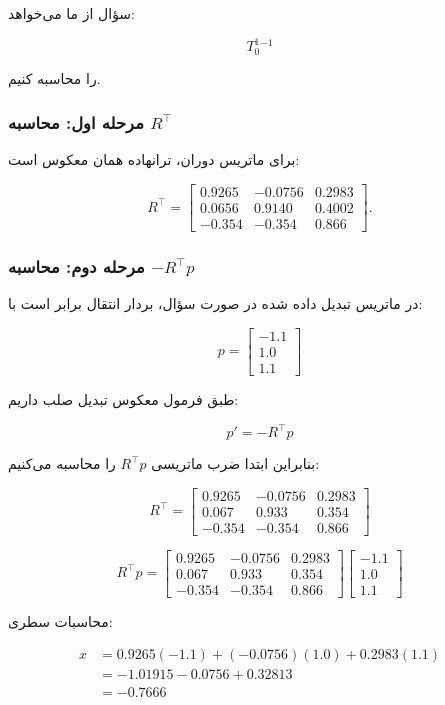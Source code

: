 \documentclass{article}
\begin{document}
سؤال از ما می‌خواهد:

\[
T_{0}^{1}{}^{-1}
\]

را محاسبه کنیم.

\subsubsection{مرحله اول: محاسبه $R^\top$}

برای ماتریس دوران، ترانهاده همان معکوس است:

\[
R^\top=
\begin{bmatrix}
	0.9265 & -0.0756 & 0.2983 \\
	0.0656 & 0.9140 & 0.4002 \\
	-0.354 & -0.354 & 0.866
\end{bmatrix}.
\]
\subsubsection{مرحله دوم: محاسبه $-R^\top p$}

در ماتریس تبدیل داده شده در صورت سؤال، بردار انتقال برابر است با:

\[
p=
\begin{bmatrix}
	-1.1\\
	1.0\\
	1.1
\end{bmatrix}
\]

طبق فرمول معکوس تبدیل صلب داریم:

\[
p' = -R^\top p
\]

بنابراین ابتدا ضرب ماتریسی $R^\top p$ را محاسبه می‌کنیم:

\[
R^\top=
\begin{bmatrix}
	0.9265 & -0.0756 & 0.2983\\
	0.067 & 0.933 & 0.354\\
	-0.354 & -0.354 & 0.866
\end{bmatrix}
\]

\[
R^\top p =
\begin{bmatrix}
	0.9265 & -0.0756 & 0.2983\\
	0.067 & 0.933 & 0.354\\
	-0.354 & -0.354 & 0.866
\end{bmatrix}
\begin{bmatrix}
	-1.1\\
	1.0\\
	1.1
\end{bmatrix}
\]

محاسبات سطری:

\[
\begin{aligned}
	x &= 0.9265(-1.1) + (-0.0756)(1.0) + 0.2983(1.1) \\
	&= -1.01915 -0.0756 +0.32813 \\
	&= -0.7666
\end{aligned}
\]
\end{document}
